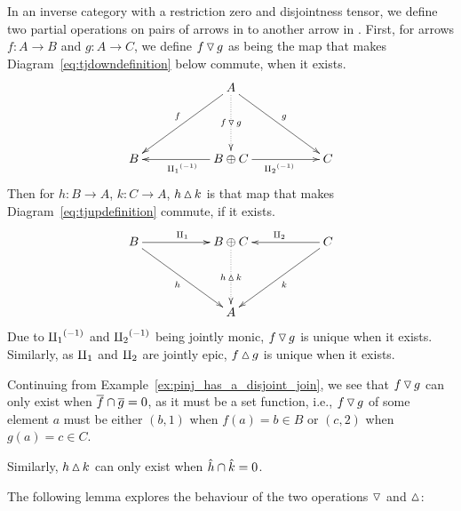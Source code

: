 \begin{definition}\label{def:up_triangle_and_down_triangle}
  In an inverse category \X with a restriction zero and disjointness tensor, we define two partial
  operations on pairs of arrows in \X to another arrow in \X. First, for arrows
  $f:A \to B$ and $g:A \to C$, we define $f\operatorname{\triangledown} g$ as
  being the map that makes Diagram~\ref{eq:tjdowndefinition} below commute, when it exists.
  \begin{equation}
    \xymatrix@C+0pt @R+20pt{
      &&A \ar[dll]_{f} \ar[drr]^{g} \ar@{.>}[d]|-{f\tjdown g}\\
      B&&B\+C \ar[ll]^{\icpa} \ar[rr]_{\icpb} && C
      }\label{eq:tjdowndefinition}
  \end{equation}
  Then for $h:B \to A$, $k: C \to A$, $h\operatorname{\vartriangle} k$ is that map that makes
  Diagram~\ref{eq:tjupdefinition} commute, if it exists.
  \begin{equation}
    \xymatrix@C+0pt @R+20pt{
      B\ar[rr]^{\cpa} \ar[drr]_{h} &&B\+C   \ar@{.>}[d]|-{h\tjup k}
        && C \ar[ll]_{\cpb} \ar[dll]^{k}\\
      &&A
      }\label{eq:tjupdefinition}
  \end{equation}
  Due to ${\amalg_{1}}^{(-1)}$ and ${\amalg_{2}}^{(-1)}$ being jointly monic, $f\operatorname{\triangledown} g$ is unique when it exists.
  Similarly, as $\amalg_{1}$ and $\amalg_{2}$ are jointly epic, $f\operatorname{\vartriangle} g$ is unique when it exists.
\end{definition}
\begin{example}[\pinj]\label{ex:pinj_has_triangle_maps_when_restriction_is_disjoint}
  Continuing from Example~\ref{ex:pinj_has_a_disjoint_join}, we see that $f\operatorname{\triangledown} g$ can only exist
  when $\overline{f} \cap \overline{g} = 0$, as it must be a set function, i.e., $f\operatorname{\triangledown} g$ of some element
  $a$ must be either $(b,1)$ when  $f(a) = b\in B$ or $(c,2)$ when $g(a) = c\in C$.

  Similarly, $h\operatorname{\vartriangle} k$ can only exist when $\hat{h} \cap \hat{k} = 0$.
\end{example}

The following lemma explores the behaviour of the two operations $\operatorname{\triangledown}$ and $\operatorname{\vartriangle}$:

